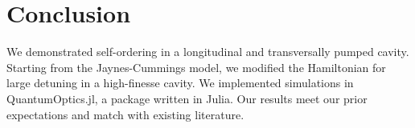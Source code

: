\section{Conclusion}

We demonstrated self-ordering in a longitudinal and transversally pumped cavity. Starting from the Jaynes-Cummings model, we modified the Hamiltonian for large detuning in a high-finesse cavity. We implemented simulations in QuantumOptics.jl, a package written in Julia. Our results meet our prior expectations and match with existing literature.